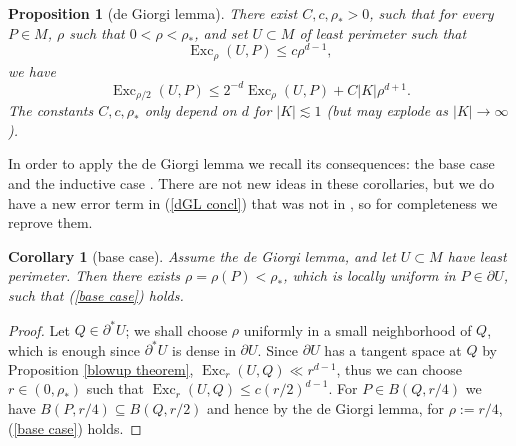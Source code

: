 \documentclass[final,12pt, leqno]{brownthesis}
\DeclareMathOperator{\Exc}{Exc}
\newtheorem{proposition}[theorem]{Proposition}
\newtheorem{corollary}[theorem]{Corollary}
\theoremstyle{definition}
\numberwithin{equation}{section}
\begin{document}
\begin{proposition}[de Giorgi lemma]\label{de Giorgi}
There exist $C, c, \rho_* > 0$, such that for every $P \in M$, $\rho$ such that $0 < \rho < \rho_*$, and set $U \subset M$ of least perimeter such that
\begin{equation}\label{base case}
\Exc_\rho(U, P) \leq c\rho^{d - 1},
\end{equation}
we have
\begin{equation}\label{dGL concl}
\Exc_{\rho/2}(U, P) \leq 2^{-d} \Exc_\rho(U, P) + C|K|\rho^{d + 1}.
\end{equation}
The constants $C, c, \rho_*$ only depend on $d$ for $|K| \lesssim 1$ (but may explode as $|K| \to \infty$).
\end{proposition}

In order to apply the de Giorgi lemma we recall its consequences: the base case \cite[pg109]{Giusti77} and the inductive case \cite[Corollary 8.3]{Giusti77}.
There are not new ideas in these corollaries, but we do have a new error term in (\ref{dGL concl}) that was not in \cite[Theorem 8.1]{Giusti77}, so for completeness we reprove them.

\begin{corollary}[base case]
Assume the de Giorgi lemma, and let $U \subset M$ have least perimeter.
Then there exists $\rho = \rho(P) < \rho_*$, which is locally uniform in $P \in \partial U$, such that (\ref{base case}) holds.
\end{corollary}
\begin{proof}
Let $Q \in \partial^* U$; we shall choose $\rho$ uniformly in a small neighborhood of $Q$, which is enough since $\partial^* U$ is dense in $\partial U$.
Since $\partial U$ has a tangent space at $Q$ by Proposition \ref{blowup theorem}, $\Exc_r(U, Q) \ll r^{d - 1}$, thus we can choose $r \in (0, \rho_*)$ such that $\Exc_r(U, Q) \leq c(r/2)^{d - 1}$.
For $P \in B(Q, r/4)$ we have $B(P, r/4) \subseteq B(Q, r/2)$ and hence by the de Giorgi lemma, for $\rho := r/4$, (\ref{base case}) holds.
\end{proof}
\end{document}
